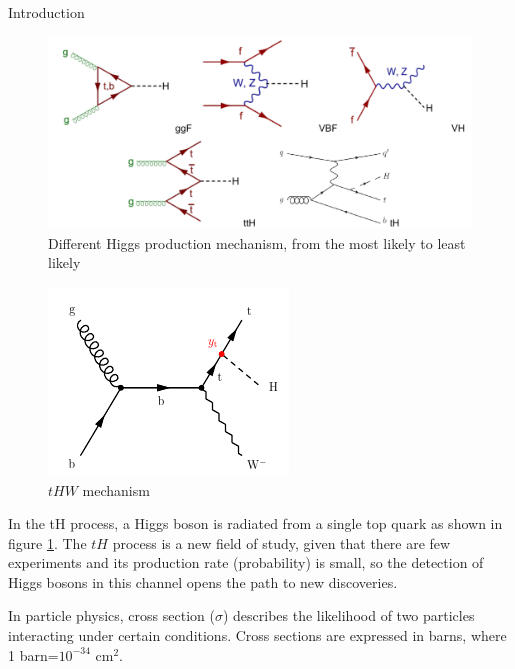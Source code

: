 \begin{chapter}{Introduction}
\begin{figure}[ht]
\centering
\includegraphics[scale=0.5]{Chapter1/pg.png}
\caption[Different Higgs production mechanism, from the most likely to least likely]{Different Higgs production mechanism, from the most likely to least likely \cite{gamma}\cite{timo}}
\label{psu}
\end{figure}

\begin{figure}[ht]
\centering
\includegraphics[scale=0.7]{Chapter1/thw.png}
\caption[$tHW$ mechanism]{$tHW$ mechanism\cite{th1}}
\label{thw}
\end{figure}

In the tH process, a Higgs boson is radiated from a single top quark as shown in figure \ref{psu}. The $tH$ process is a new field of study, given that there are few experiments and its production rate (probability) is small, so the detection of Higgs bosons in this channel opens the path to new discoveries.

In particle physics, cross section ($\sigma$) describes the likelihood of two particles interacting under certain conditions.
 Cross sections are expressed in barns, where 1 barn=$10^{-34}$ cm$^{2}$.


\end{chapter}
